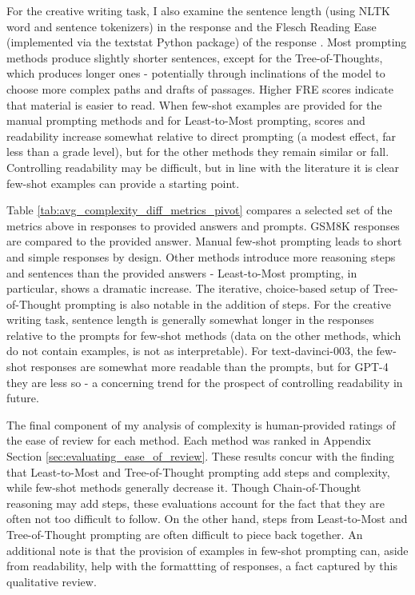 \documentclass[11pt]{article}
\begin{document}
For the creative writing task, I also examine the sentence length (using NLTK word and sentence tokenizers) in the response and the Flesch Reading Ease (implemented via the textstat Python package) of the response \cite{flesch_how_2016, aggarwal_textstat_nodate}. Most prompting methods produce slightly shorter sentences, except for the Tree-of-Thoughts, which produces longer ones - potentially through inclinations of the model to choose more complex paths and drafts of passages. Higher FRE scores indicate that material is easier to read. When few-shot examples are provided for the manual prompting methods and for Least-to-Most prompting, scores and readability increase somewhat relative to direct prompting (a modest effect, far less than a grade level), but for the other methods they remain similar or fall. Controlling readability may be difficult, but in line with the literature it is clear few-shot examples can provide a starting point. \cite{imperial_flesch_2023}

Table \ref{tab:avg_complexity_diff_metrics_pivot} compares a selected set of the metrics above in responses to provided answers and prompts. GSM8K responses are compared to the provided answer. Manual few-shot prompting leads to short and simple responses by design. Other methods introduce more reasoning steps and sentences than the provided answers - Least-to-Most prompting, in particular, shows a dramatic increase. The iterative, choice-based setup of Tree-of-Thought prompting is also notable in the addition of steps. For the creative writing task, sentence length is generally somewhat longer in the responses relative to the prompts for few-shot methods (data on the other methods, which do not contain examples, is not as interpretable). For text-davinci-003, the few-shot responses are somewhat more readable than the prompts, but for GPT-4 they are less so - a concerning trend for the prospect of controlling readability in future.

The final component of my analysis of complexity is human-provided ratings of the ease of review for each method. Each method was ranked in Appendix Section \ref{sec:evaluating_ease_of_review}. These results concur with the finding that Least-to-Most and Tree-of-Thought prompting add steps and complexity, while few-shot methods generally decrease it. Though Chain-of-Thought reasoning may add steps, these evaluations account for the fact that they are often not too difficult to follow. On the other hand, steps from Least-to-Most and Tree-of-Thought prompting are often difficult to piece back together. An additional note is that the provision of examples in few-shot prompting can, aside from readability, help with the formattting of responses, a fact captured by this qualitative review.
\end{document}

